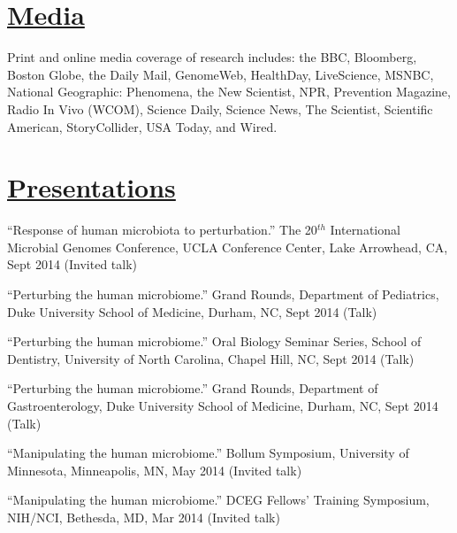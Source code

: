 \documentclass[overlapped,line,11pt]{res}
\begin{document}
\begin{resume}
\section{\underline{\sc Media}} 
\vspace{.05in} Print and online media coverage of research includes:
the BBC, Bloomberg, Boston Globe, the Daily Mail, GenomeWeb,
HealthDay, LiveScience, MSNBC, National Geographic: Phenomena, the New
Scientist, NPR, Prevention Magazine, Radio In Vivo (WCOM), Science Daily, Science News, The
Scientist, Scientific American, StoryCollider, USA Today, and Wired.

\section{\underline{\sc Presentations}}
\vspace{.25in}

\begin{revnumerate}[32]

\item {``Response of human microbiota to perturbation.''
  The 20$^{th}$ International Microbial Genomes Conference, UCLA
  Conference Center, Lake Arrowhead, CA, Sept 2014
  (Invited talk)}
\vspace*{0mm}

\item {``Perturbing the human microbiome.''
  Grand Rounds, Department of Pediatrics, Duke University School of
  Medicine, Durham, NC, Sept 2014
  (Talk)}
\vspace*{0mm}

\item {``Perturbing the human microbiome.''
  Oral Biology Seminar Series, School of Dentistry, University of
  North Carolina, Chapel Hill, NC, Sept 2014
  (Talk)}
\vspace*{0mm}

\item {``Perturbing the human microbiome.''
  Grand Rounds, Department of Gastroenterology, Duke University School of
  Medicine, Durham, NC, Sept 2014
  (Talk)}
\vspace*{0mm}

\item {``Manipulating the human microbiome.''
  Bollum Symposium, University of Minnesota, Minneapolis, MN, May 2014
  (Invited talk)}
\vspace*{0mm}

\item {``Manipulating the human microbiome.''
  DCEG Fellows’ Training Symposium, NIH/NCI, Bethesda, MD, Mar 2014
  (Invited talk)}
\vspace*{0mm}


\end{revnumerate}
\end{resume}
\end{document}
